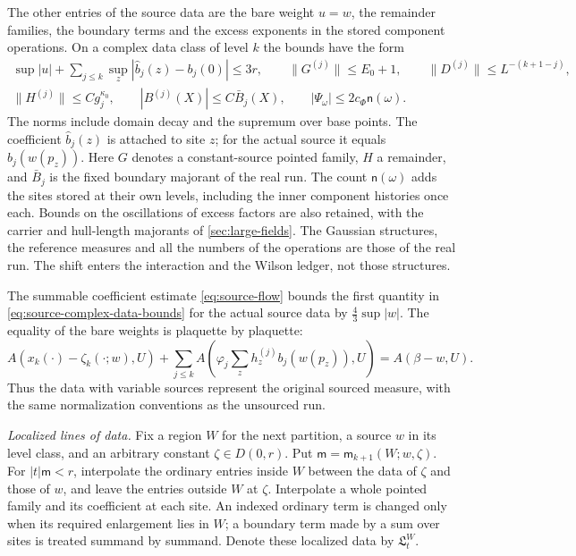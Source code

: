 \documentclass[11pt,letterpaper,reqno]{amsart}
\theoremstyle{definition}
\theoremstyle{remark}
\begin{document}
The other entries of the source data are the bare weight $u=w$,
the remainder families, the boundary terms and the excess
exponents in the stored component operations. On a complex data
class of level $k$ the bounds have the form
\begin{equation}\label{eq:source-complex-data-bounds}
 \begin{gathered}
 \sup|u|+\sum_{j\le k}\sup_z|\widehat b_j(z)-b_j(0)|\le3r,\qquad
 \|G^{(j)}\|\le E_0+1,\qquad
 \|D^{(j)}\|\le L^{-(k+1-j)},\\
 \|H^{(j)}\|\le Cg_j^{\kappa_0},\qquad
 |B^{(j)}(X)|\le C\bar B_j(X),\qquad
 |\Psi_\omega|\le2c_\Phi\mathsf n(\omega).
 \end{gathered}
\end{equation}
The norms include domain decay and the supremum over base points.
The coefficient $\widehat b_j(z)$ is attached to site $z$; for
the actual source it equals $b_j(w(p_z))$. Here $G$ denotes
a constant-source pointed family, $H$ a remainder, and
$\bar B_j$ is the fixed boundary majorant of the real run.
The count $\mathsf n(\omega)$ adds the sites stored at their own
levels, including the inner component histories once each. Bounds
on the oscillations of excess factors are also retained, with the
carrier and hull-length majorants of \cref{sec:large-fields}.
The Gaussian structures, the reference measures and all the numbers
of the operations are those of the real run. The shift enters the
interaction and the Wilson ledger, not those structures.

The summable coefficient estimate \eqref{eq:source-flow} bounds
the first quantity in \eqref{eq:source-complex-data-bounds} for
the actual source data by $\frac43\sup|w|$. The equality of the
bare weights is plaquette by plaquette:
\[
 A(x_k(\cdot)-\zeta_k(\cdot;w),U)
  +\sum_{j\le k}A\!\left(
      \varphi_j\sum_z h_z^{(j)}b_j(w(p_z)),U\right)
                         =A(\beta-w,U).
\]
Thus the data with variable sources represent the original sourced
measure, with the same normalization conventions as the unsourced
run.

\emph{Localized lines of data.}
Fix a region $W$ for the next partition, a source $w$ in its
level class, and an arbitrary constant $\zeta\in D(0,r)$.
Put $\mathsf m=\mathsf m_{k+1}(W;w,\zeta)$.
For $|t|\mathsf m<r$, interpolate the ordinary entries inside
$W$ between the data of $\zeta$ and those of $w$, and leave the
entries outside $W$ at $\zeta$. Interpolate a whole pointed
family and its coefficient at each site. An indexed ordinary
term is changed only when its required enlargement lies in $W$;
a boundary term made by a sum over sites is treated summand by
summand. Denote these localized data by $\mathfrak L_t^W$.
\end{document}
